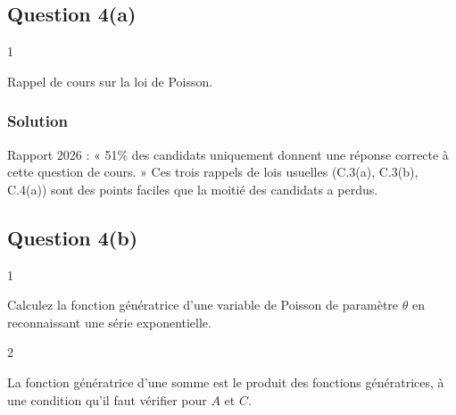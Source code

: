 \documentclass[11pt,a4paper]{article}
\newcommand{\equationajustee}[1]{%
  \sbox{\boiteequation}{$\displaystyle #1$}%
  \ifdim\wd\boiteequation>\linewidth
    \[\resizebox{\linewidth}{!}{\usebox{\boiteequation}}\]%
  \else
    \[#1\]%
  \fi}
\begin{document}
\hypertarget{question-4a-1}{%
\subsection{Question 4(a)}\label{question-4a-1}}

\begin{indication}{1}

Rappel de cours sur la loi de Poisson.

\end{indication}

\hypertarget{solution-23}{%
\subsubsection{Solution}\label{solution-23}}

\equationajustee{\boxed{\begin{aligned}{}&A(\Omega)=\mathbb{N},\\
&P(A=k)=e^{-\lambda}\frac{\lambda^k}{k!}\quad(k\in\mathbb{N})
\end{aligned}}}

\begin{jury}

Rapport 2026 : « 51\% des candidats uniquement donnent une réponse correcte à cette question de cours. » Ces trois rappels de lois usuelles (C.3(a), C.3(b), C.4(a)) sont des points faciles que la moitié des candidats a perdus.

\end{jury}

\hypertarget{question-4b-1}{%
\subsection{Question 4(b)}\label{question-4b-1}}

\begin{indication}{1}

Calculez la fonction génératrice d'une variable de Poisson de paramètre \(\theta\) en reconnaissant une série exponentielle.

\end{indication}

\begin{indication}{2}

La fonction génératrice d'une somme est le produit des fonctions génératrices, à une condition qu'il faut vérifier pour \(A\) et \(C\).

\end{indication}
\end{document}
